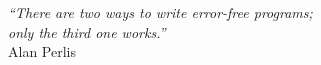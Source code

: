 \cleardoublepage
\thispagestyle{plain}

\vspace*{8cm}

\begin{flushright}
   \textsl{``There are two ways to write error-free programs; \\
           only the third one works.''} \\
\vspace*{1.5cm}
           Alan Perlis
\end{flushright}
